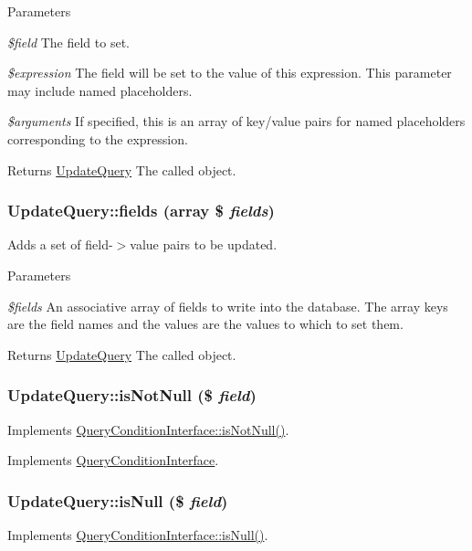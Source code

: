 \begin{DoxyParams}{Parameters}
\item[{\em \$field}]The field to set. \item[{\em \$expression}]The field will be set to the value of this expression. This parameter may include named placeholders. \item[{\em \$arguments}]If specified, this is an array of key/value pairs for named placeholders corresponding to the expression.\end{DoxyParams}
\begin{DoxyReturn}{Returns}
\hyperlink{classUpdateQuery}{UpdateQuery} The called object. 
\end{DoxyReturn}
\hypertarget{classUpdateQuery_a5d02f111de8cfe803a352c8ef0f89789}{
\subsubsection[{fields}]{\setlength{\rightskip}{0pt plus 5cm}UpdateQuery::fields (array \$ {\em fields})}}
\label{classUpdateQuery_a5d02f111de8cfe803a352c8ef0f89789}
Adds a set of field-\/$>$value pairs to be updated.


\begin{DoxyParams}{Parameters}
\item[{\em \$fields}]An associative array of fields to write into the database. The array keys are the field names and the values are the values to which to set them.\end{DoxyParams}
\begin{DoxyReturn}{Returns}
\hyperlink{classUpdateQuery}{UpdateQuery} The called object. 
\end{DoxyReturn}
\hypertarget{classUpdateQuery_a703cf7e16e0dd4e78c61e4c6ea948795}{
\subsubsection[{isNotNull}]{\setlength{\rightskip}{0pt plus 5cm}UpdateQuery::isNotNull (\$ {\em field})}}
\label{classUpdateQuery_a703cf7e16e0dd4e78c61e4c6ea948795}
Implements \hyperlink{interfaceQueryConditionInterface_a8bbb6acc9c72911b165cf6eb1dc31453}{QueryConditionInterface::isNotNull()}. 

Implements \hyperlink{interfaceQueryConditionInterface_a8bbb6acc9c72911b165cf6eb1dc31453}{QueryConditionInterface}.\hypertarget{classUpdateQuery_a027756e0adb3f423fd0c19ecbb3ec751}{
\subsubsection[{isNull}]{\setlength{\rightskip}{0pt plus 5cm}UpdateQuery::isNull (\$ {\em field})}}
\label{classUpdateQuery_a027756e0adb3f423fd0c19ecbb3ec751}
Implements \hyperlink{interfaceQueryConditionInterface_a2978b536a3fe62b21e940366c9cb5923}{QueryConditionInterface::isNull()}. 

